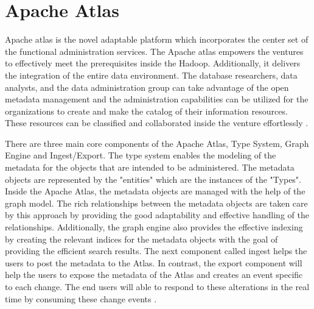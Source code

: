 \section{Apache Atlas}
Apache atlas is the novel adaptable platform which incorporates the center
set of the functional administration services. The Apache atlas empowers
the ventures to effectively meet the prerequisites inside the Hadoop.
Additionally, it delivers the integration of the entire data environment.
The database researchers, data analysts, and the data administration group
can take advantage of the open metadata management and the administration
capabilities can be utilized for the organizations to create and make the
catalog of their information resources. These resources can be classified
and collaborated inside the venture effortlessly
\cite{hid-sp18-412-Apache_Atlas_by_Maven}.

There are three main core components of the Apache Atlas, Type System,
Graph Engine and Ingest/Export. The type system enables the modeling of
the metadata for the objects that are intended to be administered.
The metadata objects are represented by the "entities" which are the
instances of the "Types". Inside the Apache Atlas, the metadata objects are
managed with the help of the graph model. The rich relationships between the
metadata objects are taken care by this approach by providing the good
adaptability and effective handling of the relationships. Additionally,
the graph engine also provides the effective indexing by creating the
relevant indices for the metadata objects with the goal of providing the
efficient search results. The next component called ingest helps the users
to post the metadata to the Atlas. In contrast, the export component will
help the users to expose the metadata of the Atlas and creates an event
specific to each change. The end users will able to respond to these
alterations in the real time by consuming these change events
\cite{hid-sp18-412-Apache_Atlas_architecture}.

